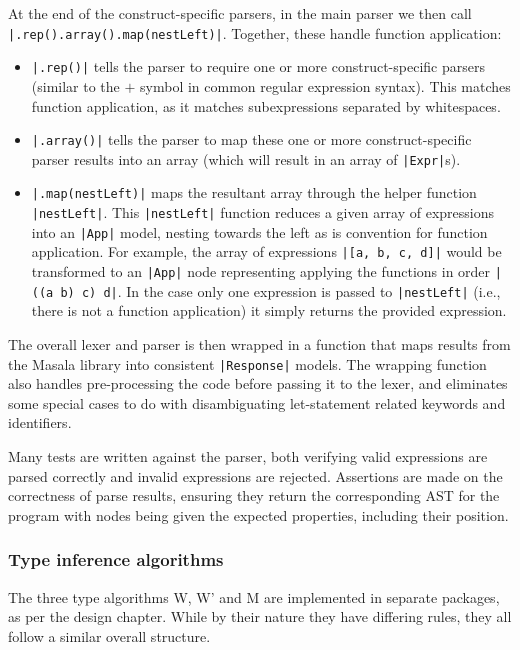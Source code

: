 \documentclass[a4paper,fleqn,12pt]{article}
\begin{document}
At the end of the construct-specific parsers, in the main parser we then call \texttt{|.rep().array().map(nestLeft)|}. Together, these handle function application:
\begin{itemize}
  \item \texttt{|.rep()|} tells the parser to require one or more construct-specific parsers (similar to the $+$ symbol in common regular expression syntax). This matches function application, as it matches subexpressions separated by whitespaces.
  \item \texttt{|.array()|} tells the parser to map these one or more construct-specific parser results into an array (which will result in an array of \texttt{|Expr|}s).
  \item \texttt{|.map(nestLeft)|} maps the resultant array through the helper function \texttt{|nestLeft|}. This \texttt{|nestLeft|} function reduces a given array of expressions into an \texttt{|App|} model, nesting towards the left as is convention for function application. For example, the array of expressions \texttt{|[a, b, c, d]|} would be transformed to an \texttt{|App|} node representing applying the functions in order \texttt{|((a b) c) d|}. In the case only one expression is passed to \texttt{|nestLeft|} (i.e., there is not a function application) it simply returns the provided expression.
\end{itemize}

The overall lexer and parser is then wrapped in a function that maps results from the Masala library into consistent \texttt{|Response|} models. The wrapping function also handles pre-processing the code before passing it to the lexer, and eliminates some special cases to do with disambiguating let-statement related keywords and identifiers.

Many tests are written against the parser, both verifying valid expressions are parsed correctly and invalid expressions are rejected. Assertions are made on the correctness of parse results, ensuring they return the corresponding AST for the program with nodes being given the expected properties, including their position.
\subsubsection{Type inference algorithms}\label{id:h.flyu66glh76t}
The three type algorithms W, W’ and M are implemented in separate packages, as per the design chapter. While by their nature they have differing rules, they all follow a similar overall structure.
\end{document}
